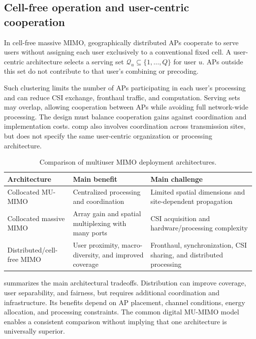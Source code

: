 \subsection{Cell-free operation and user-centric cooperation}
In cell-free massive MIMO, geographically distributed APs cooperate to serve users without assigning each user exclusively to a conventional fixed cell. A user-centric architecture selects a serving set $\mathcal Q_u\subseteq\{1,\ldots,Q\}$ for user $u$. APs outside this set do not contribute to that user's combining or precoding.

Such clustering limits the number of APs participating in each user's processing and can reduce CSI exchange, fronthaul traffic, and computation. Serving sets may overlap, allowing cooperation between APs while avoiding full network-wide processing. The design must balance cooperation gains against coordination and implementation costs. \Ac{comp} also involves coordination across transmission sites, but does not specify the same user-centric organization or processing architecture.

\begin{table}[htbp]
	\centering
	\small
	\caption{Comparison of multiuser MIMO deployment architectures.}
	\label{tab:architectures-05}
	\begin{tabular}{p{30mm}p{43mm}p{66mm}}
		\toprule
		Architecture & Main benefit & Main challenge\\
		\midrule
		Collocated MU-MIMO
		& Centralized processing and coordination
		& Limited spatial dimensions and site-dependent propagation\\
		Collocated massive MIMO
		& Array gain and spatial multiplexing with many ports
		& CSI acquisition and hardware/processing complexity\\
		Distributed/cell-free MIMO
		& User proximity, macro-diversity, and improved coverage
		& Fronthaul, synchronization, CSI sharing, and distributed processing\\
		\bottomrule
	\end{tabular}
\end{table}
 summarizes the main architectural tradeoffs. Distribution can improve coverage, user separability, and fairness, but requires additional coordination and infrastructure. Its benefits depend on AP placement, channel conditions, energy allocation, and processing constraints. The common digital MU-MIMO model enables a consistent comparison without implying that one architecture is universally superior.


